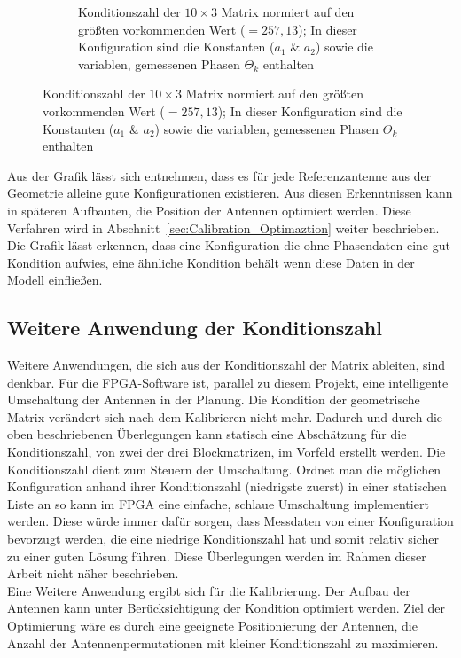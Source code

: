 \begin{figure}[h!]
\begin{subfigure}[t]{0.45\textwidth}
                 \caption{Konditionszahl der $10\times3$ Matrix normiert auf den größten vorkommenden Wert ($=257,13$); In dieser Konfiguration sind die Konstanten ($a_1$ \& $a_2$) sowie die variablen, gemessenen Phasen $\Theta_k$ enthalten}
                 \label{fig:AnalyzeOf10x3}
         \end{subfigure}
%
\end{figure}
%
Aus der Grafik lässt sich entnehmen, dass es für jede Referenzantenne aus der Geometrie alleine gute Konfigurationen existieren. Aus diesen Erkenntnissen kann in späteren Aufbauten, die Position der Antennen optimiert werden. Diese Verfahren wird in Abschnitt~\ref{sec:Calibration_Optimaztion} weiter beschrieben. Die Grafik lässt erkennen, dass eine Konfiguration die ohne Phasendaten eine gut Kondition aufwies, eine ähnliche Kondition behält wenn diese Daten in der Modell einfließen.
%
\subsection{Weitere Anwendung der Konditionszahl}
Weitere Anwendungen, die sich aus der Konditionszahl der Matrix ableiten, sind denkbar. Für die FPGA-Software ist, parallel zu diesem Projekt, eine intelligente Umschaltung der Antennen in der Planung. Die Kondition der geometrische Matrix verändert sich nach dem Kalibrieren nicht mehr. Dadurch und durch die oben beschriebenen Überlegungen kann statisch eine Abschätzung für die Konditionszahl, von zwei der drei Blockmatrizen, im Vorfeld erstellt werden. Die Konditionszahl dient zum Steuern der Umschaltung. Ordnet man die möglichen Konfiguration anhand ihrer Konditionszahl (niedrigste zuerst) in einer statischen Liste an so kann im FPGA eine einfache, schlaue Umschaltung implementiert werden. Diese würde immer dafür sorgen, dass Messdaten von einer Konfiguration bevorzugt werden, die eine niedrige Konditionszahl hat und somit relativ sicher zu einer guten Lösung führen. Diese Überlegungen werden im Rahmen dieser Arbeit nicht näher beschrieben.\\
Eine Weitere Anwendung ergibt sich für die Kalibrierung. Der Aufbau der Antennen kann unter Berücksichtigung der Kondition optimiert werden. Ziel der Optimierung wäre es durch eine geeignete Positionierung der Antennen, die Anzahl der Antennenpermutationen mit kleiner Konditionszahl zu maximieren.
